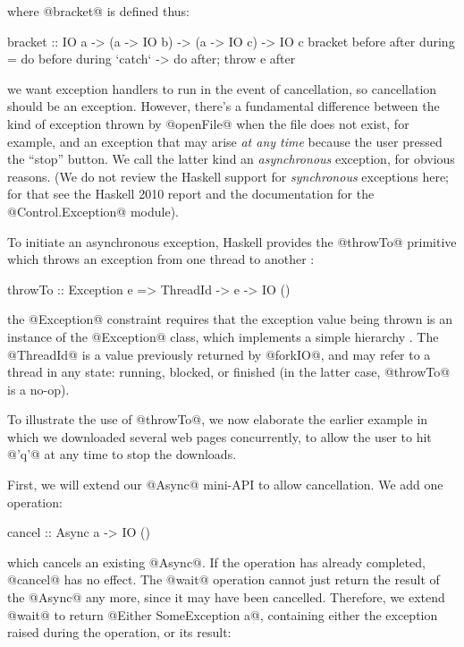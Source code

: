 \noindent where @bracket@ is defined thus:

\begin{haskell}
bracket :: IO a -> (a -> IO b) -> (a -> IO c) -> IO c
bracket before after during = do
  before
  during `catch` \e -> do after; throw e
  after
\end{haskell}

\noindent we want exception handlers to run in the event of
cancellation, so cancellation should be an exception.  However,
there's a fundamental difference between the kind of exception thrown
by @openFile@ when the file does not exist, for example, and an
exception that may arise \emph{at any time} because the user pressed
the ``stop'' button.  We call the latter kind an \emph{asynchronous}
exception, for obvious reasons.  (We do not review the Haskell support
for \emph{synchronous} exceptions here; for that see the Haskell 2010
report \cite{haskell2010} and the documentation for the
@Control.Exception@ module).

To initiate an asynchronous exception, Haskell provides the @throwTo@
primitive which throws an exception from one thread to
another \cite{spj:asynch-exceptions}:

\begin{haskell}
throwTo :: Exception e => ThreadId -> e -> IO ()
\end{haskell}

\noindent the @Exception@ constraint requires that the exception value
being thrown is an instance of the @Exception@ class, which implements
a simple hierarchy \cite{extensible-exceptions}.  The @ThreadId@ is a
value previously returned by @forkIO@, and may refer to a thread in
any state: running, blocked, or finished (in the latter case,
@throwTo@ is a no-op).

To illustrate the use of @throwTo@, we now elaborate the earlier
example in which we downloaded several web pages concurrently, to
allow the user to hit @'q'@ at any time to stop the downloads.

First, we will extend our @Async@ mini-API to allow cancellation.  We
add one operation:

\begin{haskell}
cancel :: Async a -> IO ()
\end{haskell}

\noindent which cancels an existing @Async@.  If the operation has
already completed, @cancel@ has no effect.  The @wait@ operation
cannot just return the result of the @Async@ any more, since it may
have been cancelled.  Therefore, we extend @wait@ to return
@Either SomeException a@, containing either the exception raised during the
operation, or its result:

